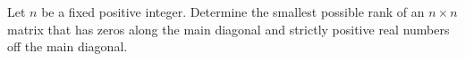 Let $n$ be a fixed positive integer. Determine the smallest possible rank of an $n\times n$ matrix that has zeros along the main diagonal and strictly positive real numbers off the main diagonal.

